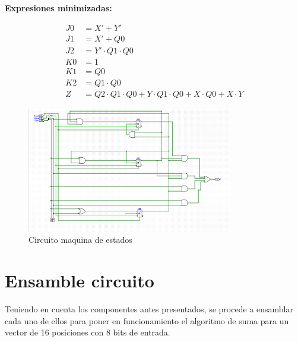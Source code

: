 \documentclass{article}
\begin{document}
\textbf{Expresiones minimizadas:}

\begin{align*}
    J0 &= X' + Y' \\
    J1 &= X' + Q0 \\
    J2 &= Y' \cdot Q1 \cdot Q0 \\
    K0 &= 1 \\
    K1 &= Q0 \\
    K2 &= Q1 \cdot Q0 \\
    Z &= Q2 \cdot Q1 \cdot Q0 + Y \cdot Q1 \cdot Q0 + X \cdot Q0 + X \cdot Y
\end{align*}
\begin{figure}[h] %
    \centering
    \includegraphics[width=0.8\textwidth]{imagenes/circuito_estados.png} %
    \caption{Circuito maquina de estados} %
    \label{fig:circuitoestados} %
\end{figure}

\section{Ensamble circuito}
Teniendo en cuenta los componentes antes presentados, se procede a ensamblar cada uno de ellos para poner en 
funcionamiento el algoritmo de suma para un vector de 16 posiciones con 8 bits de entrada.
\end{document}

